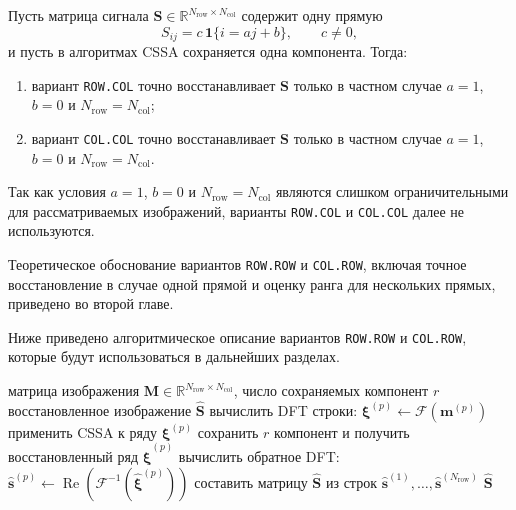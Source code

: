 \begin{statement}
Пусть матрица сигнала $\mathbf{S}\in\mathbb{R}^{N_{\mathrm{row}}\times N_{\mathrm{col}}}$
содержит одну прямую
\[
S_{ij}=c\,\mathbf{1}\{i=aj+b\}, \qquad c\ne 0,
\]
и пусть в алгоритмах CSSA сохраняется одна компонента. Тогда:
\begin{enumerate}
	\item вариант \texttt{ROW.COL} точно восстанавливает $\mathbf{S}$ только в частном случае
	$a=1$, $b=0$ и $N_{\mathrm{row}}=N_{\mathrm{col}}$;
	\item вариант \texttt{COL.COL} точно восстанавливает $\mathbf{S}$ только в частном случае
	$a=1$, $b=0$ и $N_{\mathrm{row}}=N_{\mathrm{col}}$.
\end{enumerate}
\end{statement}

Так как условия $a=1$, $b=0$ и $N_{\mathrm{row}}=N_{\mathrm{col}}$ являются
слишком ограничительными для рассматриваемых изображений, варианты
\texttt{ROW.COL} и \texttt{COL.COL} далее не используются.

Теоретическое обоснование вариантов \texttt{ROW.ROW} и \texttt{COL.ROW},
включая точное восстановление в случае одной прямой и оценку ранга для
нескольких прямых, приведено во второй главе.

Ниже приведено алгоритмическое описание вариантов \texttt{ROW.ROW} и
\texttt{COL.ROW}, которые будут использоваться в дальнейших разделах.

\begin{algorithm}[H]
	\caption{Алгоритм \texttt{CSSA ROW.ROW}}
	\begin{algorithmic}[1]
		\Require матрица изображения $\mathbf{M}\in\mathbb{R}^{N_{\mathrm{row}}\times N_{\mathrm{col}}}$, число сохраняемых компонент $r$
		\Ensure восстановленное изображение $\widehat{\mathbf{S}}$
			\State вычислить DFT строки: $\boldsymbol{\xi}^{(p)} \gets \mathcal{F}(\mathbf{m}^{(p)})$
			\State применить CSSA к ряду $\boldsymbol{\xi}^{(p)}$
			\State сохранить $r$ компонент и получить восстановленный ряд $\widehat{\boldsymbol{\xi}}^{(p)}$
			\State вычислить обратное DFT:
			$\widehat{\mathbf{s}}^{(p)} \gets \operatorname{Re}(\mathcal{F}^{-1}(\widehat{\boldsymbol{\xi}}^{(p)}))$
		\EndFor
		\State составить матрицу $\widehat{\mathbf{S}}$ из строк $\widehat{\mathbf{s}}^{(1)},\dots,\widehat{\mathbf{s}}^{(N_{\mathrm{row}})}$
		\State \Return $\widehat{\mathbf{S}}$
	\end{algorithmic}
\end{algorithm}

